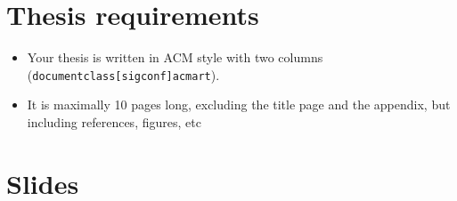 \documentclass[a4paper,pdf]{article} %
\begin{document}
%

\pagebreak

\todototoc
\listoftodos
\tableofcontents

\pagebreak

\begin{abstract}
\end{abstract}


\section*{Thesis requirements}
\begin{itemize}
\item Your thesis is written in ACM style with two columns  (\texttt{documentclass[sigconf]{acmart}}).
\item It is maximally 10 pages long, excluding the title page and the appendix, but including references, figures, etc
\end{itemize}


\pagebreak













\appendix

%


\section{Slides}


 
\end{document}
